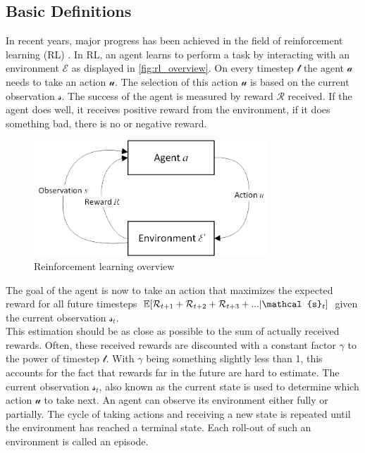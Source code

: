 \subsection*{Basic Definitions}\label{basic_rl_definitions}
In recent years, major progress has been achieved in the field of reinforcement learning (RL) \cite{mnih2013playing,alphazero,hideandseek}.
In RL, an agent learns to perform a task by interacting with an environment $\mathcal{E}$ as displayed in \autoref{fig:rl_overview}. On every timestep $\mathcal{t}$ the agent $\mathcal{a}$ needs to take an action $\mathcal{u}$. The selection of this action $\mathcal{u}$ is based on the current observation $\mathcal{s}$. The success of the agent is measured by reward $\mathcal{R}$ received. If the agent does well, it receives positive reward from the environment, if it does something bad, there is no or negative reward.
\begin{figure}[H]
	\centering
	\includegraphics[width=250pt]{images/rl_overview.png}
	\caption{Reinforcement learning overview}
	\label{fig:rl_overview}
\end{figure}
The goal of the agent is now to take an action that maximizes the expected reward for all future timesteps $\EX[\mathcal{R}_{t+1}+\mathcal{R}_{t+2}+\mathcal{R}_{t+3}+...|\mathcal{s}_{t}]$ given the current observation $\mathcal{s}_{t}$.\\
This estimation should be as close as possible to the sum of actually received rewards. Often, these received rewards are discounted with a constant factor $\mathcal{\gamma}$ to the power of timestep $\mathcal{t}$. With $\mathcal{\gamma}$ being something slightly less than 1, this accounts for the fact that rewards far in the future are hard to estimate.
The current observation $\mathcal{s}_{t}$, also known as the current state is used to determine which action $\mathcal{u}$ to take next. An agent can observe its environment either fully or partially. The cycle of taking actions and receiving a new state is repeated until the environment has reached a terminal state. Each roll-out of such an environment is called an episode.
